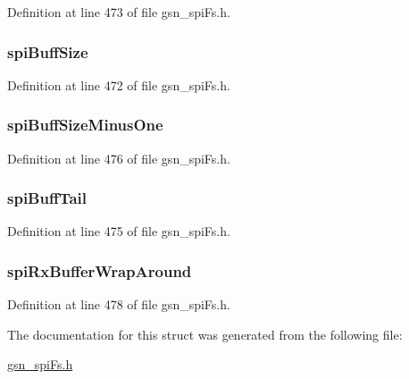 Definition at line 473 of file gsn\_\-spiFs.h.

\hypertarget{a00236_a7015ecf2e079b914011daba0d4146670}{
\subsubsection[{spiBuffSize}]{ {\bf spiBuffSize}}}
\label{a00236_a7015ecf2e079b914011daba0d4146670}


Definition at line 472 of file gsn\_\-spiFs.h.

\hypertarget{a00236_ac0819f802dab9ed6eeb2618636615369}{
\subsubsection[{spiBuffSizeMinusOne}]{ {\bf spiBuffSizeMinusOne}}}
\label{a00236_ac0819f802dab9ed6eeb2618636615369}


Definition at line 476 of file gsn\_\-spiFs.h.

\hypertarget{a00236_a0f15b8dada019c7bc412bb5577e7e1a9}{
\subsubsection[{spiBuffTail}]{ {\bf spiBuffTail}}}
\label{a00236_a0f15b8dada019c7bc412bb5577e7e1a9}


Definition at line 475 of file gsn\_\-spiFs.h.

\hypertarget{a00236_a96a5d87289fc127e9767d76752758b9e}{
\subsubsection[{spiRxBufferWrapAround}]{ {\bf spiRxBufferWrapAround}}}
\label{a00236_a96a5d87289fc127e9767d76752758b9e}


Definition at line 478 of file gsn\_\-spiFs.h.



The documentation for this struct was generated from the following file:\begin{DoxyCompactItemize}
\item 
\hyperlink{a00589}{gsn\_\-spiFs.h}\end{DoxyCompactItemize}

